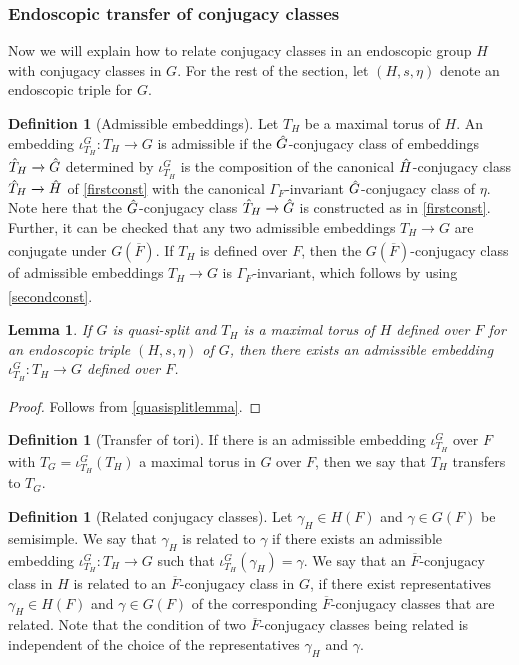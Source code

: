 \documentclass[11pt,a4paper]{article}
\theoremstyle{definition}
\newtheorem{D}[shared]{Definition}
\theoremstyle{plain}
\newtheorem{Le}[shared]{Lemma}
\theoremstyle{remark}
\theoremstyle{plain}
\begin{document}
\subsubsection{Endoscopic transfer of conjugacy classes}
Now we will explain how to relate conjugacy classes in an endoscopic group $H$ with conjugacy classes in $G$. For the rest of the section, let $(H,s,\eta)$ denote an endoscopic triple for $G$.

\begin{D}[Admissible embeddings]\label{admissibleembedding}
    Let $T_H$ be a maximal torus of $H$. An embedding $\iota_{T_H}^G: T_H \xrightarrow[]{} G$ is admissible if the $\Hat{G}$-conjugacy class of embeddings $\Hat{T}_H \xrightarrow[]{} \Hat{G}$ determined by $\iota_{T_H}^G$ is the composition of the canonical $\Hat{H}$-conjugacy class $\Hat{T}_H \xrightarrow[]{} \Hat{H}$ of \ref{firstconst} with the canonical $\Gamma_F$-invariant $\Hat{G}$-conjugacy class of $\eta$. Note here that the $\Hat{G}$-conjugacy class $\Hat{T}_H \xrightarrow[]{} \Hat{G}$ is constructed as in \ref{firstconst}. Further, it can be checked that any two admissible embeddings $T_H \xrightarrow[]{} G$ are conjugate under $G(\overline{F})$. If $T_H$ is defined over $F$, then the $G(\overline{F})$-conjugacy class of admissible embeddings $T_H \xrightarrow[]{} G$ is $\Gamma_F$-invariant, which follows by using \ref{secondconst}.
\end{D}

\begin{Le}\label{quasisplit}
    If $G$ is quasi-split and $T_H$ is a maximal torus of $H$ defined over $F$ for an endoscopic triple $(H,s,\eta)$ of $G$, then there exists an admissible embedding $\iota_{T_H}^G: T_H \xrightarrow[]{} G$ defined over $F$.
\end{Le}
\begin{proof}
    Follows from \ref{quasisplitlemma}.
\end{proof}

\begin{D}[Transfer of tori]
    If there is an admissible embedding $\iota_{T_H}^G$ over $F$ with $T_G = \iota_{T_H}^G(T_H)$ a maximal torus in $G$ over $F$, then we say that $T_H$ transfers to $T_G$.
\end{D}

\begin{D}[Related conjugacy classes]\label{relatedelementsdef}
    Let $\gamma_H \in H(F)$ and $\gamma \in G(F)$ be semisimple. We say that $\gamma_H$ is related to $\gamma$ if there exists an admissible embedding $\iota_{T_H}^G: T_H \xrightarrow[]{} G$ such that $\iota_{T_H}^G(\gamma_H) = \gamma$. We say that an $\overline{F}$-conjugacy class in $H$ is related to an $\overline{F}$-conjugacy class in $G$, if there exist representatives $\gamma_H \in H(F)$ and $\gamma \in G(F)$ of the corresponding $\overline{F}$-conjugacy classes that are related. Note that the condition of two $\overline{F}$-conjugacy classes being related is independent of the choice of the representatives $\gamma_H$ and $\gamma$.
\end{D}
\end{document}
